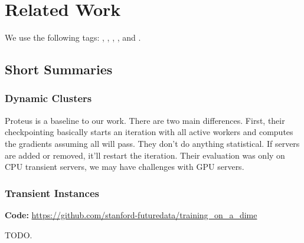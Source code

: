 \chapter{Related Work}
\label{ch:related work}

We use the following tags: \tagdynamic{}, \tagtransient{},
\tagmodelparallelism{}, \tagdataparallelism{}, and \tagoptimizer{}.

\section{Short Summaries}

\subsection{Dynamic Clusters}


\noindent \tagdynamic{} \tagdataparallelism{}

Proteus is a baseline to our work.
There are two main differences.
First, their checkpointing basically starts an iteration with all active workers
and computes the gradients assuming all will pass.
They don't do anything statistical.
If servers are added or removed, it'll restart the iteration.
Their evaluation was only on CPU transient servers, we may have challenges with
GPU servers.


\noindent \tagdynamic{}


\noindent \tagdynamic{}

\subsection{Transient Instances}


\noindent \tagdynamic{} \tagdataparallelism{}

\noindent \textbf{Code:} \url{https://github.com/stanford-futuredata/training_on_a_dime}

TODO.


\noindent \tagdynamic{} \tagdataparallelism{}

